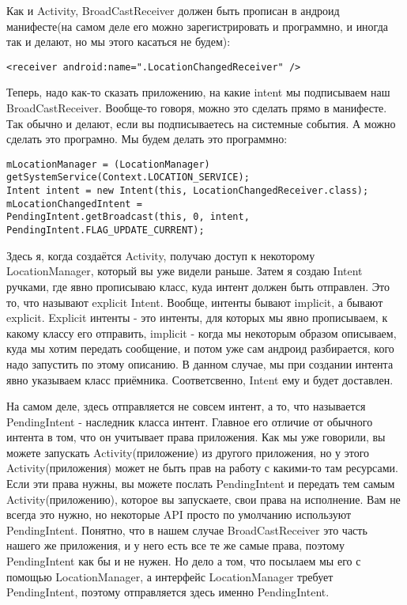\documentclass[12 pt]{article}
\begin{document}
    Как и Activity, BroadCastReceiver должен быть прописан в андроид манифесте(на самом деле его можно зарегистрировать и программно, и иногда так и делают, но мы этого касаться не будем):
    \begin{lstlisting}
<receiver android:name=".LocationChangedReceiver" />
    \end{lstlisting} Теперь, надо как-то сказать приложению, на какие intent мы подписываем наш BroadCastReceiver. Вообще-то говоря, можно это сделать прямо в манифесте. Так обычно и делают, если вы подписываетесь на системные события. А можно сделать это програмно. Мы будем делать это программно:
    \begin{lstlisting}
mLocationManager = (LocationManager) getSystemService(Context.LOCATION_SERVICE);
Intent intent = new Intent(this, LocationChangedReceiver.class);
mLocationChangedIntent =
PendingIntent.getBroadcast(this, 0, intent, PendingIntent.FLAG_UPDATE_CURRENT);
    \end{lstlisting} Здесь я, когда создаётся Activity, получаю доступ к некоторому LocationManager, который вы уже видели раньше. Затем я создаю Intent ручками, где явно прописываю класс, куда интент должен быть отправлен. Это то, что называют explicit Intent. Вообще, интенты бывают implicit, а бывают explicit. Explicit интенты - это интенты, для которых мы явно прописываем, к какому классу его отправить, implicit - когда мы некоторым образом описываем, куда мы хотим передать сообщение, и потом уже сам андроид разбирается, кого надо запустить по этому описанию. В данном случае, мы при создании интента явно указываем класс приёмника. Соответсвенно, Intent ему и будет доставлен. 
    
    На самом деле, здесь отправляется не совсем интент, а то, что называется PendingIntent - наследник класса интент. Главное его отличие от обычного интента в том, что он учитывает права приложения. Как мы уже говорили, вы можете запускать Activity(приложение) из другого приложения, но у этого Activity(приложения) может не быть прав на работу с какими-то там ресурсами. Если эти права нужны, вы можете послать PendingIntent и передать тем самым Activity(приложению), которое вы запускаете, свои права на исполнение. Вам не всегда это нужно, но некоторые API просто по умолчанию используют PendingIntent. Понятно, что в нашем случае BroadCastReceiver это часть нашего же приложения, и у него есть все те же самые права, поэтому PendingIntent как бы и не нужен. Но дело а том, что посылаем мы его с помощью LocationManager, а интерфейс LocationManager требует PendingIntent, поэтому отправляется здесь именно PendingIntent. 
    
\end{document}
